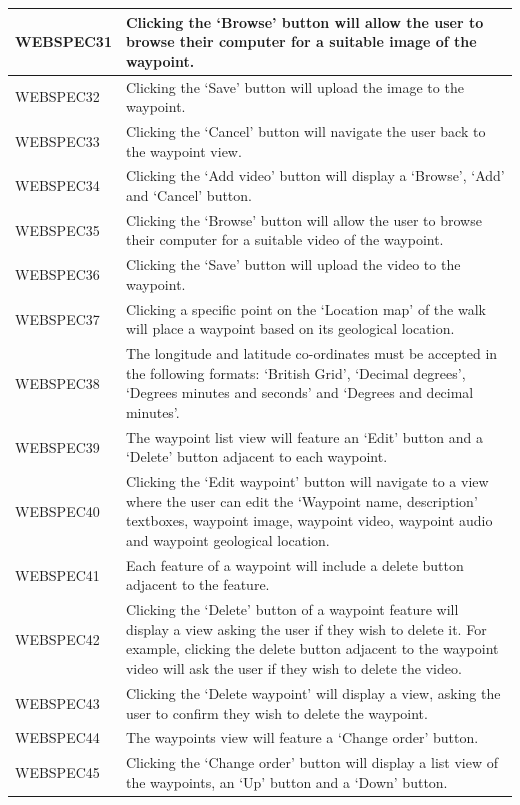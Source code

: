 \documentclass[11pt,a4paper]{article}
\begin{document}
\begin{longtable}{|p{2.5cm}p{13cm}|}
WEBSPEC31 & Clicking the `Browse' button will allow the user to browse their computer for a suitable image of the waypoint. \\ \hline
WEBSPEC32 & Clicking the `Save' button will upload the image to the waypoint. \\ \hline
WEBSPEC33 & Clicking the `Cancel' button will navigate the user back to the waypoint view. \\ \hline
WEBSPEC34 & Clicking the `Add video' button will display a `Browse', `Add' and `Cancel' button. \\ \hline
WEBSPEC35 & Clicking the `Browse' button will allow the user to browse their computer for a suitable video of the waypoint. \\ \hline
WEBSPEC36 & Clicking the `Save' button will upload the video to the waypoint. \\ \hline
WEBSPEC37 & Clicking a specific point on the `Location map' of the walk will place a waypoint based on its geological location. \\ \hline
WEBSPEC38 & The longitude and latitude co-ordinates must be accepted in the following formats: `British Grid', `Decimal degrees', `Degrees minutes and seconds' and `Degrees and decimal minutes'. \\ \hline
WEBSPEC39 & The waypoint list view will feature an `Edit' button and a `Delete' button adjacent to each waypoint. \\ \hline
WEBSPEC40 & Clicking the `Edit waypoint' button will navigate to a view where the user can edit the `Waypoint name, description' textboxes, waypoint image, waypoint video, waypoint audio and waypoint geological location. \\ \hline
WEBSPEC41 & Each feature of a waypoint will include a delete button adjacent to the feature. \\ \hline
WEBSPEC42 & Clicking the `Delete' button of a waypoint feature will display a view asking the user if they wish to delete it. For example, clicking the delete button adjacent to the waypoint video will ask the user if they wish to delete the video. \\ \hline
WEBSPEC43 & Clicking the `Delete waypoint' will display a view, asking the user to confirm they wish to delete the waypoint. \\ \hline
WEBSPEC44 & The waypoints view will feature a `Change order' button. \\ \hline
WEBSPEC45 & Clicking the `Change order' button will display a list view of the waypoints, an `Up' button and a `Down' button. \\ \hline

\end{longtable}
\end{document}
